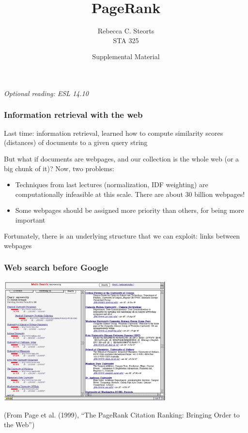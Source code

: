 \documentclass[mathserif]{beamer}
\def\red{\color[rgb]{0.8,0,0}}
\begin{document}

\title{PageRank}
\author{Rebecca C. Steorts \\ STA 325}
\date{Supplemental Material}

\begin{frame}
\titlepage
{\it Optional reading: ESL 14.10}
\end{frame}

\begin{frame}
\frametitle{Information retrieval with the web}
Last time: {\red information
retrieval}, learned how to compute similarity
scores (distances) of documents to a given 
query string

\bigskip
But what if documents are {\red webpages,} and our 
collection is the whole web (or a big chunk of it)?
Now, two problems:
\begin{itemize}
\item Techniques from last lectures 
(normalization, IDF weighting) are 
{\red computationally infeasible} 
at this scale. There are about 30
billion webpages!
\item Some webpages should be assigned more
{\red priority} than others, for being 
more important
\end{itemize}

\bigskip
Fortunately, there is an underlying structure that 
we can exploit: {\red links between webpages}
\end{frame}

\begin{frame}
\frametitle{Web search before Google}
\begin{center}
\includegraphics[width=3.5in]{pagerank.pdf}
\end{center}
\vspace{-5pt}
(From Page et al. (1999), ``The PageRank Citation Ranking:
Bringing Order to the Web'')
\end{frame}
\end{document}
